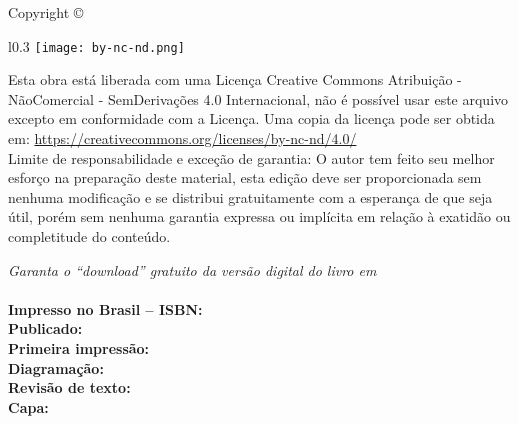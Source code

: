 
\newpage
\thispagestyle{empty}

\noindent Copyright \copyright\ \imprimiryear\ \myauthor\\ %

\begin{wrapfigure}{l}{0.3\textwidth}
\texttt{[image: by-nc-nd.png]}
\end{wrapfigure}
\noindent Esta obra está liberada com uma Licença 
Creative Commons Atribuição - NãoComercial - SemDerivações 4.0 Internacional,
não é possível usar este arquivo excepto em conformidade com a Licença. 
Uma copia da licença pode ser obtida em:
\url{https://creativecommons.org/licenses/by-nc-nd/4.0/}\\ %


\noindent Limite de responsabilidade e exceção de garantia: O autor tem feito
seu melhor esforço na preparação deste material,
esta edição deve ser proporcionada sem nenhuma modificação e
se distribui gratuitamente com a esperança de que seja útil, 
porém sem nenhuma garantia expressa ou implícita em relação à exatidão ou completitude do conteúdo.

\noindent \textit{Garanta o ``download'' gratuito da versão digital do livro em \ImprimirLinkHomePageLivro}\\

~\\

\noindent \textbf{Impresso no Brasil -- ISBN:} \imprimirisbn\\ %
\noindent \textbf{Publicado:} \imprimireditora\\ %
\noindent \textbf{Primeira impressão:}  \imprimirdata\\ %
\noindent \textbf{Diagramação:} \myauthor\\ %
\noindent \textbf{Revisão de texto:} \myauthor\\ %
\noindent \textbf{Capa:} \myauthor\\ %
~\\

\vfill

